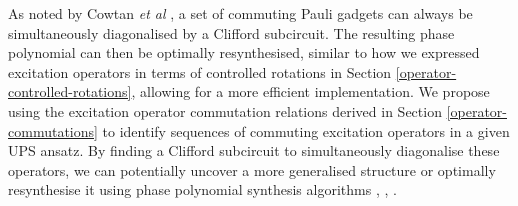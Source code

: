As noted by Cowtan \textit{et al} \cite{Cowtan2020}, a set of commuting Pauli gadgets can always be simultaneously diagonalised by a Clifford subcircuit. The resulting phase polynomial can then be optimally resynthesised, similar to how we expressed excitation operators in terms of controlled rotations in Section \ref{operator-controlled-rotations}, allowing for a more efficient implementation. We propose using the excitation operator commutation relations derived in Section \ref{operator-commutations} to identify sequences of commuting excitation operators in a given UPS ansatz. By finding a Clifford subcircuit to simultaneously diagonalise these operators, we can potentially uncover a more generalised structure or optimally resynthesise it using phase polynomial synthesis algorithms \cite{Amy2013}, \cite{Amy2014}, \cite{Nam2018}.
